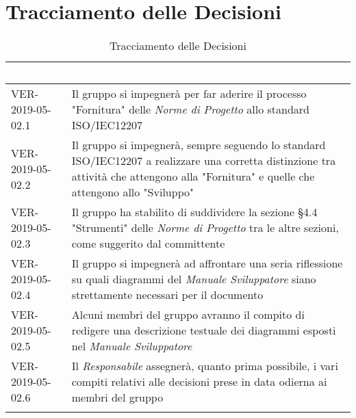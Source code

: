 \newpage
\section{Tracciamento delle Decisioni}

\begin{longtable}{|C{.33\textwidth}|C{.61\textwidth}|}
\hline
{}\textbf{\textcolor{white}{Codice}} & \textbf{\textcolor{white}{Decisione}}\\
\hline
VER-2019-05-02.1 & Il gruppo si impegnerà per far aderire il processo "Fornitura" delle \textit{Norme di Progetto} allo standard ISO/IEC12207\\
\hline
{}VER-2019-05-02.2 & Il gruppo si impegnerà, sempre seguendo lo standard ISO/IEC12207 a realizzare una corretta distinzione tra attività che attengono alla "Fornitura" e quelle che attengono allo "Sviluppo"\\
\hline
VER-2019-05-02.3 & Il gruppo ha stabilito di suddividere la sezione §4.4 "Strumenti" delle \textit{Norme di Progetto} tra le altre sezioni, come suggerito dal committente \\
\hline
{}VER-2019-05-02.4 & Il gruppo si impegnerà ad affrontare una seria riflessione su quali diagrammi del \textit{Manuale Sviluppatore} siano strettamente necessari per il documento\\
\hline
VER-2019-05-02.5 & Alcuni membri del gruppo avranno il compito di redigere una descrizione testuale dei diagrammi esposti nel \textit{Manuale Sviluppatore}\\
\hline
{}VER-2019-05-02.6 & Il \textit{Responsabile} assegnerà, quanto prima possibile, i vari compiti relativi alle decisioni prese in data odierna ai membri del gruppo \\
\hline
\caption{Tracciamento delle Decisioni}
\end{longtable}

